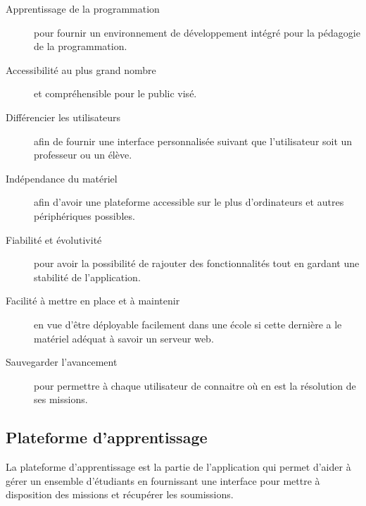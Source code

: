 \begin{description}
  \item[Apprentissage de la programmation] pour fournir un environnement de développement intégré pour la pédagogie de la programmation.
  \item[Accessibilité au plus grand nombre] et compréhensible pour le public visé.
  \item[Différencier les utilisateurs] afin de fournir une interface personnalisée suivant que l'utilisateur soit un professeur ou un élève.
  \item[Indépendance du matériel] afin d'avoir une plateforme accessible sur le plus d'ordinateurs et autres périphériques possibles.
  \item[Fiabilité et évolutivité] pour avoir la possibilité de rajouter des fonctionnalités tout en gardant une stabilité de l'application.
  \item[Facilité à mettre en place et à maintenir] en vue d'être déployable facilement dans une école si cette dernière a le matériel adéquat à savoir un serveur web.
  \item[Sauvegarder l'avancement] pour permettre à chaque utilisateur de connaitre où en est la résolution de ses missions.
\end{description}

\subsection{Plateforme d'apprentissage}
La plateforme d'apprentissage est la partie de l'application qui permet d'aider à gérer un ensemble d'étudiants en fournissant une interface pour mettre à disposition des missions et récupérer les soumissions.

